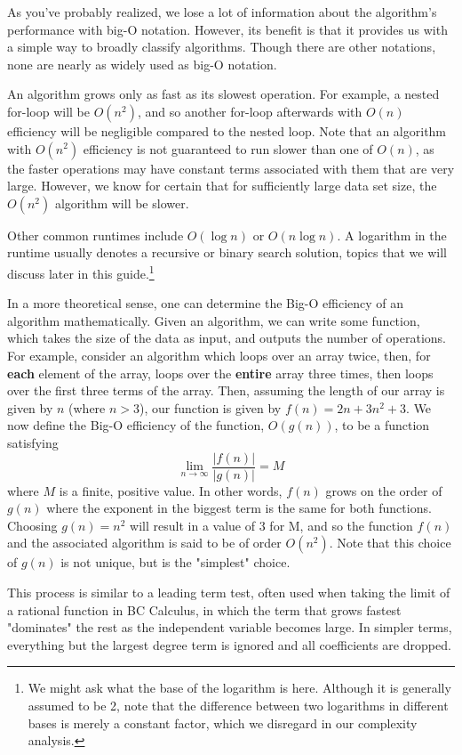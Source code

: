 As you've probably realized, we lose a lot of information about the algorithm's performance with big-O notation. However, its benefit is that it provides us with a simple way to broadly classify algorithms. Though there are other notations, none are nearly as widely used as big-O notation.

An algorithm grows only as fast as its slowest operation.  For example, a nested for-loop will be $ O(n^2) $, and so another for-loop afterwards with $ O(n) $ efficiency will be negligible compared to the nested loop.  Note that an algorithm with $ O(n^2) $ efficiency is not guaranteed to run slower than one of $ O(n) $, as the faster operations may have constant terms associated with them that are very large.  However, we know for certain that for sufficiently large data set size, the $ O(n^2) $ algorithm will be slower.

Other common runtimes include $ O(\log n) $ or $ O(n\log n) $. A logarithm in the runtime usually denotes a recursive or binary search solution, topics that we will discuss later in this guide.\footnote{We might ask what the base of the logarithm is here. Although it is generally assumed to be 2, note that the difference between two logarithms in different bases is merely a constant factor, which we disregard in our complexity analysis.}

In a more theoretical sense, one can determine the Big-O efficiency of an algorithm mathematically.  Given an algorithm, we can write some function, which takes the size of the data as input, and outputs the number of operations.  For example, consider an algorithm which loops over an array twice, then, for \textbf{each} element of the array, loops over the \textbf{entire} array three times, then loops over the first three terms of the array.  Then, assuming the length of our array is given by $ n $ (where $ n > 3 $), our function is given by $ f(n) = 2n + 3n^2 + 3 $.  We now define the Big-O efficiency of the function, $ O(g(n)) $, to be a function satisfying
$$ \lim_{n \to \infty}{\frac{|f(n)|}{|g(n)|}} = M $$ 
where $ M $ is a finite, positive value.  In other words, $ f(n) $ grows on the order of $ g(n) $ where the exponent in the biggest term is the same for both functions.  Choosing $ g(n) = n^2 $ will result in a value of $ 3 $ for M, and so the function $ f(n) $ and the associated algorithm is said to be of order $ O(n^2) $.  Note that this choice of $ g(n) $ is not unique, but is the "simplest" choice.

This process is similar to a leading term test, often used when taking the limit of a rational function in BC Calculus, in which the term that grows fastest "dominates" the rest as the independent variable becomes large. In simpler terms, everything but the largest degree term is ignored and all coefficients are dropped.

